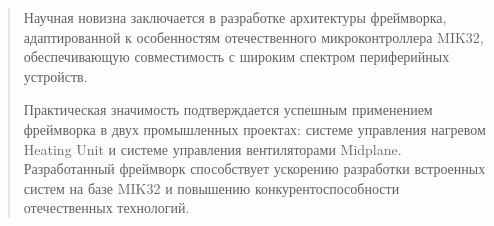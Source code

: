\begin{abstract}
Научная новизна заключается в разработке архитектуры фреймворка, адаптированной к особенностям отечественного микроконтроллера MIK32, обеспечивающую совместимость с широким спектром периферийных устройств.

Практическая значимость подтверждается успешным применением фреймворка в двух промышленных проектах: системе управления нагревом Heating Unit и системе управления вентиляторами Midplane. Разработанный фреймворк способствует ускорению разработки встроенных систем на базе MIK32 и повышению конкурентоспособности отечественных технологий.

\end{abstract}

